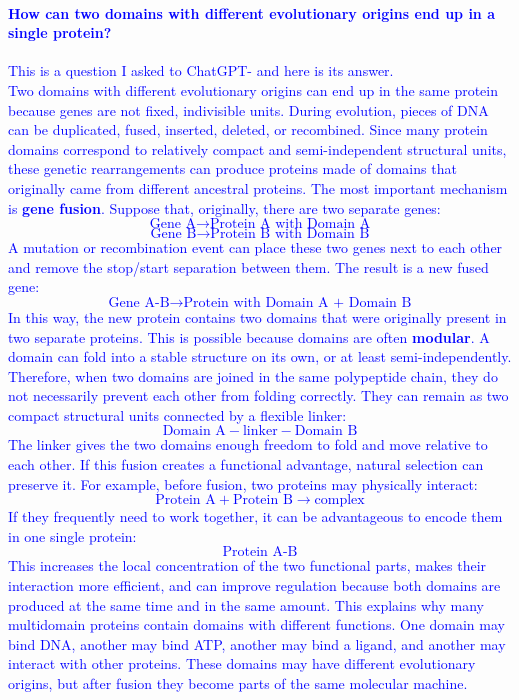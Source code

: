 \textcolor{blue}{
\paragraph{How can two domains with different evolutionary origins end up in a single protein?}
This is a question I asked to ChatGPT- and here is its answer. \\
Two domains with different evolutionary origins can end up in the same protein because genes are not fixed, indivisible units. During evolution, pieces of DNA can be duplicated, fused, inserted, deleted, or recombined. Since many protein domains correspond to relatively compact and semi-independent structural units, these genetic rearrangements can produce proteins made of domains that originally came from different ancestral proteins.
The most important mechanism is \textbf{gene fusion}. Suppose that, originally, there are two separate genes:
\[
\text{Gene A} \rightarrow \text{Protein A with Domain A}
\]
\[
\text{Gene B} \rightarrow \text{Protein B with Domain B}
\]
A mutation or recombination event can place these two genes next to each other and remove the stop/start separation between them. The result is a new fused gene:
\[
\text{Gene A-B} \rightarrow \text{Protein with Domain A + Domain B}
\]
In this way, the new protein contains two domains that were originally present in two separate proteins.
This is possible because domains are often \textbf{modular}. A domain can fold into a stable structure on its own, or at least semi-independently. Therefore, when two domains are joined in the same polypeptide chain, they do not necessarily prevent each other from folding correctly. They can remain as two compact structural units connected by a flexible linker:
\[
\boxed{\text{Domain A}} - \text{linker} - \boxed{\text{Domain B}}
\]
The linker gives the two domains enough freedom to fold and move relative to each other. If this fusion creates a functional advantage, natural selection can preserve it.
For example, before fusion, two proteins may physically interact:
\[
\text{Protein A} + \text{Protein B} \rightarrow \text{complex}
\]
If they frequently need to work together, it can be advantageous to encode them in one single protein:
\[
\text{Protein A-B}
\]
This increases the local concentration of the two functional parts, makes their interaction more efficient, and can improve regulation because both domains are produced at the same time and in the same amount.
This explains why many multidomain proteins contain domains with different functions. One domain may bind DNA, another may bind ATP, another may bind a ligand, and another may interact with other proteins. These domains may have different evolutionary origins, but after fusion they become parts of the same molecular machine.
}
